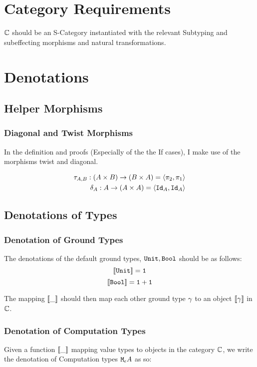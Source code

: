 \documentclass{report}
\begin{document}
\chapter{Category Requirements}
$\mathbb{C}$ should be an S-Category instantiated with the relevant Subtyping and subeffecting morphisms and natural transformations.

\chapter{Denotations}
\section{Helper Morphisms}
\subsection{Diagonal and Twist Morphisms}

In the definition and proofs (Especially of the the If cases), I make use of the morphisms twist and diagonal.

\begin{align}
    \tau_{A, B}: (A\times B) \rightarrow (B\times A) = \langle\pi_2, \pi_1\rangle\\
    \delta_{A}: A \rightarrow (A\times A)  = \langle\texttt{Id}_{A}, \texttt{Id}_{A}\rangle
\end{align}
\section{Denotations of Types}
\subsection{Denotation of Ground Types}
The denotations of the default ground types, $\texttt{Unit}, \texttt{Bool}$ should be as follows:
\begin{equation}
    {\bf [\![}\texttt{Unit}{\bf ]\!]} = \texttt{1}
\end{equation}
\begin{equation}
    {\bf [\![}\texttt{Bool}{\bf ]\!]} = \texttt{1} + \texttt{1}
\end{equation}

The mapping ${\bf [\![}\_{\bf ]\!]}$ should then map each other ground type $\gamma$ to an object ${\bf [\![}\gamma{\bf ]\!]}$ in $\mathbb{C}$.

\subsection{Denotation of Computation Types}
Given a function ${\bf [\![}\_{\bf ]\!]}$ mapping value types to objects in the category $\mathbb{C}$, we write the denotation of Computation types $\texttt{M}_{\epsilon}{A}$ as so:
\end{document}
